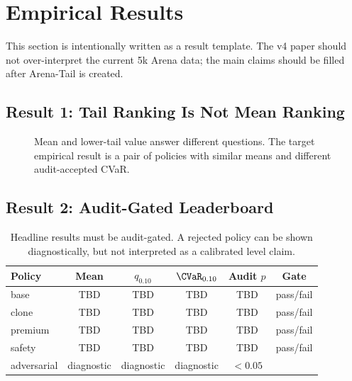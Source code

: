 \section{Empirical Results}
\label{sec:experiments}

This section is intentionally written as a result template. The v4 paper should not over-interpret the current 5k Arena data; the main claims should be filled after Arena-Tail is created.

\subsection{Result 1: Tail Ranking Is Not Mean Ranking}

\begin{figure}[t]
\centering
{}
\caption{Mean and lower-tail value answer different questions. The target empirical result is a pair of policies with similar means and different audit-accepted CVaR.}
\label{fig:mean-vs-cvar}
\end{figure}

\subsection{Result 2: Audit-Gated Leaderboard}

\begin{table}[t]
\centering
\small
\begin{tabular}{lccccc}
\toprule
Policy & Mean & $q_{0.10}$ & $\CVaR_{0.10}$ & Audit $p$ & Gate \\
\midrule
base & TBD & TBD & TBD & TBD & pass/fail \\
clone & TBD & TBD & TBD & TBD & pass/fail \\
premium & TBD & TBD & TBD & TBD & pass/fail \\
safety & TBD & TBD & TBD & TBD & pass/fail \\
adversarial & diagnostic & diagnostic & diagnostic & $<0.05$ & \RefuseLevel{} \\
\bottomrule
\end{tabular}
\caption{Headline results must be audit-gated. A rejected policy can be shown diagnostically, but not interpreted as a calibrated level claim.}
\label{tab:audit-gated-leaderboard}
\end{table}

